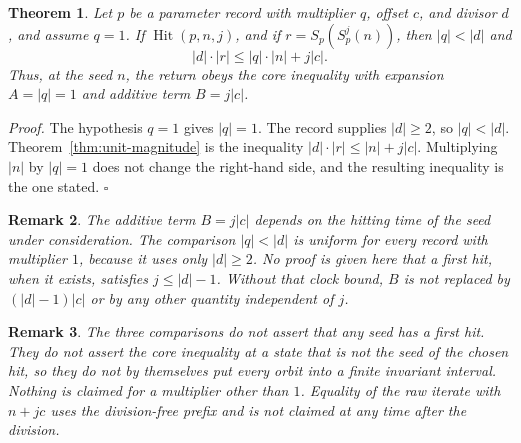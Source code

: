 \documentclass[11pt,letterpaper]{article}
\newtheorem{theorem}{Theorem}
\newtheorem{remark}[theorem]{Remark}
\newenvironment{proof}{\noindent\textit{Proof.}}{\hfill\(\square\)}
\begin{document}
\begin{theorem}
\label{thm:unit-core}
Let \(p\) be a parameter record with multiplier \(q\), offset \(c\), and
divisor \(d\), and assume \(q=1\). If \(\operatorname{Hit}(p,n,j)\), and if
\(r=S_p(S_p^{j}(n))\), then \(|q|<|d|\) and
\[
|d|\cdot|r|\le |q|\cdot|n|+j|c|.
\]
Thus, at the seed \(n\), the return obeys the core inequality with expansion
\(A=|q|=1\) and additive term \(B=j|c|\).
\end{theorem}

\begin{proof}
The hypothesis \(q=1\) gives \(|q|=1\). The record supplies \(|d|\ge 2\), so
\(|q|<|d|\). Theorem~\ref{thm:unit-magnitude} is the inequality
\(|d|\cdot|r|\le |n|+j|c|\). Multiplying \(|n|\) by \(|q|=1\) does not change
the right-hand side, and the resulting inequality is the one stated.
\end{proof}

\begin{remark}
\label{rem:not-uniform}
The additive term \(B=j|c|\) depends on the hitting time of the seed under
consideration. The comparison \(|q|<|d|\) is uniform for every record with
multiplier \(1\), because it uses only \(|d|\ge 2\). No proof is given here
that a first hit, when it exists, satisfies \(j\le |d|-1\). Without that
clock bound, \(B\) is not replaced by \((|d|-1)|c|\) or by any other quantity
independent of \(j\).
\end{remark}

\begin{remark}
\label{rem:not-claimed}
The three comparisons do not assert that any seed has a first hit. They do not
assert the core inequality at a state that is not the seed of the chosen hit,
so they do not by themselves put every orbit into a finite invariant interval.
Nothing is claimed for a multiplier other than \(1\). Equality of the raw
iterate with \(n+jc\) uses the division-free prefix and is not claimed at any
time after the division.
\end{remark}
\end{document}

